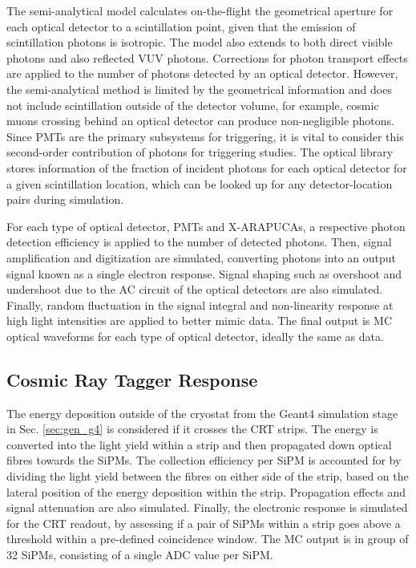 The semi-analytical model calculates on-the-flight the geometrical aperture for each optical detector to a scintillation point, given that the emission of scintillation photons is isotropic.
The model also extends to both direct visible photons and also reflected VUV photons. 
Corrections for photon transport effects are applied to the number of photons detected by an optical detector.
However, the semi-analytical method is limited by the geometrical information and does not include scintillation outside of the detector volume, for example, cosmic muons crossing behind an optical detector can produce non-negligible photons.
Since PMTs are the primary subsystems for triggering, it is vital to consider this second-order contribution of photons for triggering studies.
The optical library stores information of the fraction of incident photons for each optical detector for a given scintillation location, which can be looked up for any detector-location pairs during simulation. 

For each type of optical detector, PMTs and X-ARAPUCAs, a respective photon detection efficiency is applied to the number of detected photons.
Then, signal amplification and digitization are simulated, converting photons into an output signal known as a single electron response.
Signal shaping such as overshoot and undershoot due to the AC circuit of the optical detectors are also simulated.
Finally, random fluctuation in the signal integral and non-linearity response at high light intensities are applied to better mimic data.
The final output is MC optical waveforms for each type of optical detector, ideally the same as data. 

\subsection{Cosmic Ray Tagger Response}

The energy deposition outside of the cryostat from the Geant4 simulation stage in Sec. \ref{sec:gen_g4} is considered if it crosses the CRT strips.
The energy is converted into the light yield within a strip and then propagated down optical fibres towards the SiPMs.
The collection efficiency per SiPM is accounted for by dividing the light yield between the fibres on either side of the strip, based on the lateral position of the energy deposition within the strip.
Propagation effects and signal attenuation are also simulated.
Finally, the electronic response is simulated for the CRT readout, by assessing if a pair of SiPMs within a strip goes above a threshold within a pre-defined coincidence window.
The MC output is in group of 32 SiPMs, consisting of a single ADC value per SiPM.

